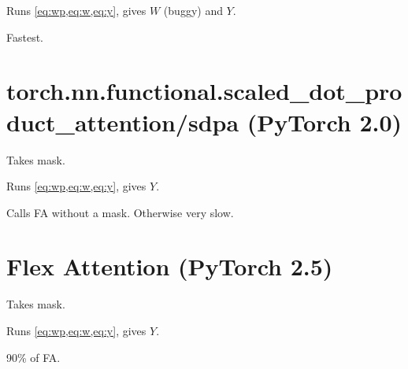 \documentclass{article}
\begin{document}
Runs \cref{eq:wp,eq:w,eq:y}, gives $W$ (buggy) and $Y$.

Fastest.

\section{torch.nn.functional.scaled_dot_product_attention/sdpa (PyTorch 2.0)}
Takes mask.

Runs \cref{eq:wp,eq:w,eq:y}, gives $Y$.

Calls FA without a mask. Otherwise very slow.

\section{Flex Attention (PyTorch 2.5)}
Takes mask.

Runs \cref{eq:wp,eq:w,eq:y}, gives $Y$.

90\% of FA.
\end{document}
